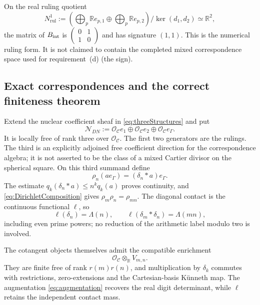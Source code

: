 \documentclass[11pt]{amsart}
\theoremstyle{definition}
\theoremstyle{remark}
\newcommand{\R}{\mathbb R}
\begin{document}
On the real ruling quotient
\begin{equation}\label{eq:rulingquotient}
 N^1_{\mathrm{rul}}:=
 \left(\bigoplus_p\R e_{p,1}\oplus\bigoplus_p\R e_{p,2}\right)
       /\ker(d_1,d_2)\simeq\R^2,
\end{equation}
the matrix of $B_{\rm int}$ is
$\left(\begin{smallmatrix}0&1\\1&0\end{smallmatrix}\right)$ and has
signature $(1,1)$.  This is the numerical ruling form.  It is not claimed
to contain the completed mixed correspondence space used for requirement~(d) (the sign).

\subsection{Exact correspondences and the correct finiteness theorem}

Extend the nuclear coefficient sheaf in \eqref{eq:threeStructures} and put
\begin{equation}\label{eq:NDN}
 \mathcal N_{DN}:=
 \mathcal O_{\mathcal C}e_1\oplus
 \mathcal O_{\mathcal C}e_2\oplus
 \mathcal O_{\mathcal C}e_\Gamma.
\end{equation}
It is locally free of rank three over $\mathcal O_{\mathcal C}$.  The first
two generators are the rulings.  The third is an explicitly adjoined free
coefficient direction for the correspondence algebra; it is not asserted
to be the class of a mixed Cartier divisor on the spherical square.  On
this third summand define
\begin{equation}\label{eq:nuclearAction}
 \rho_n(ae_\Gamma)=(\delta_n*a)e_\Gamma.
\end{equation}
The estimate $q_k(\delta_n*a)\leq n^kq_k(a)$ proves continuity, and
\eqref{eq:DirichletComposition} gives
$\rho_m\rho_n=\rho_{mn}$.  The diagonal contact is the continuous functional
$\ell$, so
\begin{equation}\label{eq:nuclearExactContact}
 \ell(\delta_n)=\Lambda(n),\qquad
 \ell(\delta_m*\delta_n)=\Lambda(mn),
\end{equation}
including even prime powers; no
reduction of the arithmetic label modulo two is involved.

The cotangent objects themselves admit the compatible enrichment
\[
 \mathcal O_{\mathcal C}\otimes_{\R}V_{m,n}.
\]
They are finite free of rank $r(m)r(n)$, and multiplication by $\delta_k$
commutes with restrictions, zero-extensions and the Cartesian-basis
K\"unneth map.  The augmentation \eqref{eq:augmentation} recovers the real
digit determinant, while $\ell$ retains the independent contact mass.
\end{document}
